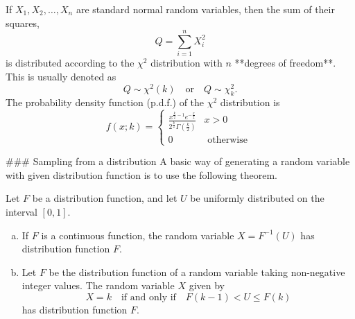 \begin{definition}
If $X_1, X_2, \dots , X_n$ are standard normal random variables, then the sum of their squares,
\begin{equation*}
    Q = \sum_{i=1}^n X_i^2
\end{equation*}
is distributed according to the $\chi^2$ distribution with $n$ **degrees of freedom**. This is usually denoted as
\begin{equation*}
    Q \sim \chi^2(k) \quad \text{or} \quad Q \sim \chi^2_k.
\end{equation*}
The probability density function (p.d.f.) of the $\chi^2$ distribution is
\begin{equation*}
    f(x ; k)=\left\{\begin{array}{ll}
    {\frac{x^{\frac{k}{2}-1} e^{-\frac{x}{2}}}{2^{\frac{k}{2}} \Gamma\left(\frac{k}{2}\right)}} & {x>0} \\ 
    {0} & {\text { otherwise }}\end{array}\right.
\end{equation*}
\end{definition}


### Sampling from a distribution
A basic way of generating a random variable with given distribution function is to use the following theorem. 
\begin{theorem}
Let $F$ be a distribution function, and let $U$ be uniformly distributed on the interval $[0, 1]$. 
\begin{enumerate}[(a)]
    \item If $F$ is a continuous function, the random variable $X = F^{-1} (U)$ has distribution function $F$.
    \item Let $F$ be the distribution function of a random variable taking non-negative integer values. The random variable $X$ given by 
    \begin{equation*}
        X = k \quad \text{if and only if} \quad F(k-1) < U \leq F(k)
    \end{equation*}
    has distribution function $F$. 
\end{enumerate}
\end{theorem}




